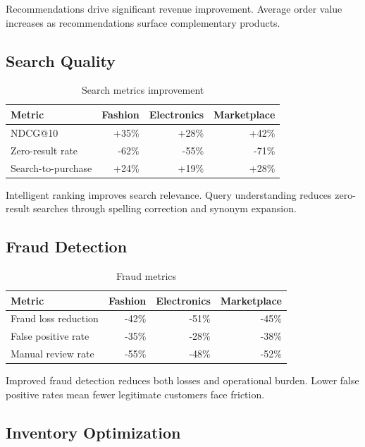 \documentclass[11pt,twocolumn]{article}
\begin{document}
Recommendations drive significant revenue improvement. Average order value increases as recommendations surface complementary products.

\subsection{Search Quality}

\begin{table}[h]
\centering
\caption{Search metrics improvement}
\label{tab:search}
\begin{tabular}{lrrr}
\hline
Metric & Fashion & Electronics & Marketplace \\
\hline
NDCG@10 & +35\% & +28\% & +42\% \\
Zero-result rate & -62\% & -55\% & -71\% \\
Search-to-purchase & +24\% & +19\% & +28\% \\
\hline
\end{tabular}
\end{table}

Intelligent ranking improves search relevance. Query understanding reduces zero-result searches through spelling correction and synonym expansion.

\subsection{Fraud Detection}

\begin{table}[h]
\centering
\caption{Fraud metrics}
\label{tab:fraud}
\begin{tabular}{lrrr}
\hline
Metric & Fashion & Electronics & Marketplace \\
\hline
Fraud loss reduction & -42\% & -51\% & -45\% \\
False positive rate & -35\% & -28\% & -38\% \\
Manual review rate & -55\% & -48\% & -52\% \\
\hline
\end{tabular}
\end{table}

Improved fraud detection reduces both losses and operational burden. Lower false positive rates mean fewer legitimate customers face friction.

\subsection{Inventory Optimization}
\end{document}
